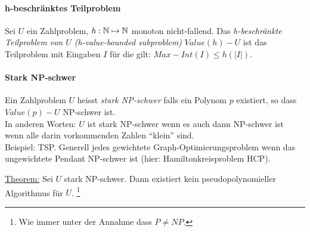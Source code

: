 \paragraph{h-beschränktes Teilproblem}
Sei $U$ ein Zahlproblem, $h: \mathbb{N} \mapsto \mathbb{N}$ monoton nicht-fallend.
Das \emph{h-beschränkte Teilproblem von $U$ (h-value-bounded subproblem)} $Value(h)-U$
ist das Teilproblem mit Eingaben $I$ für die gilt: $Max-Int(I) \leq h(|I|)$.

\paragraph{Stark NP-schwer}
Ein Zahlproblem $U$ heisst \emph{stark NP-schwer} falls ein Polynom $p$ existiert,
so dass $Value(p)-U$ NP-schwer ist. \\
In anderen Worten: $U$ ist stark NP-schwer wenn es auch dann NP-schwer ist wenn alle
darin vorkommenden Zahlen ``klein'' sind.
\\
Beispiel: TSP. Generell jedes gewichtete Graph-Optimierungsproblem wenn das ungewichtete Pendant NP-schwer ist (hier: Hamiltonkreisproblem HCP).

\underline{Theorem:}
Sei $U$ stark NP-schwer. Dann existiert kein pseudopolynomieller Algorithmus für $U$.%
\footnote{Wie immer unter der Annahme dass $P \neq NP$.}
